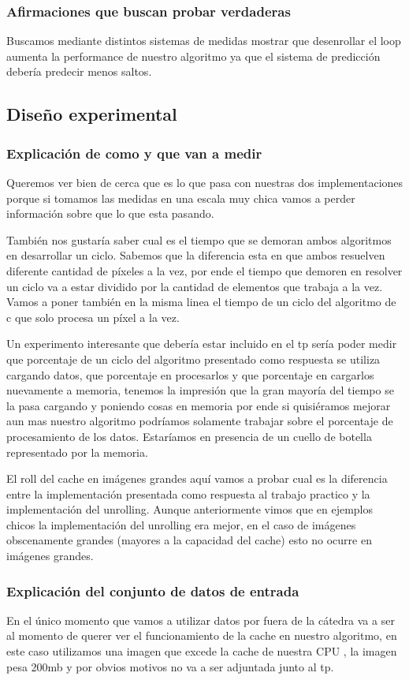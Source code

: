\subsubsection*{Afirmaciones que buscan probar verdaderas}
Buscamos mediante distintos sistemas de medidas mostrar que desenrollar el loop aumenta la performance de nuestro algoritmo ya que el sistema de predicción debería predecir menos saltos.

\subsection{Diseño experimental}
\subsubsection*{Explicación de como y que van a medir}
Queremos ver bien de cerca que es lo que pasa con nuestras dos implementaciones porque si tomamos las medidas en una escala muy chica vamos a perder información sobre que lo que esta pasando. 

También nos gustaría saber cual es el tiempo que se demoran ambos algoritmos en desarrollar un ciclo. Sabemos que la diferencia esta en que ambos resuelven diferente cantidad de  píxeles a la vez, por ende el tiempo que demoren en resolver un ciclo va a estar dividido por la cantidad de elementos que trabaja a la vez. Vamos a poner también en la misma linea el tiempo de un ciclo del algoritmo de c que solo procesa un píxel a la vez.

Un experimento interesante que debería estar incluido en el tp sería poder medir que porcentaje de un ciclo del algoritmo presentado como respuesta se utiliza cargando datos, que porcentaje en procesarlos y que porcentaje en cargarlos nuevamente a memoria, tenemos la impresión que la gran mayoría del tiempo se la pasa cargando y poniendo cosas en memoria por ende si quisiéramos mejorar aun mas nuestro algoritmo podríamos solamente trabajar sobre el porcentaje de procesamiento de los datos. Estaríamos en presencia de un cuello de botella representado por la memoria.

El roll del cache en imágenes grandes aquí vamos a probar cual es la diferencia entre la implementación presentada como respuesta al trabajo practico y la implementación del unrolling. Aunque anteriormente vimos que en ejemplos chicos la implementación del unrolling era mejor, en el caso de imágenes obscenamente grandes (mayores a la capacidad del cache) esto no ocurre en imágenes grandes.
\subsubsection*{Explicación del conjunto de datos de entrada}
En el único momento que vamos a utilizar datos por fuera de la cátedra va a ser al momento de querer ver el funcionamiento de la cache en nuestro algoritmo, en este caso utilizamos una imagen que excede la cache de nuestra CPU , la imagen pesa 200mb y por obvios motivos no va a ser adjuntada junto al tp.
